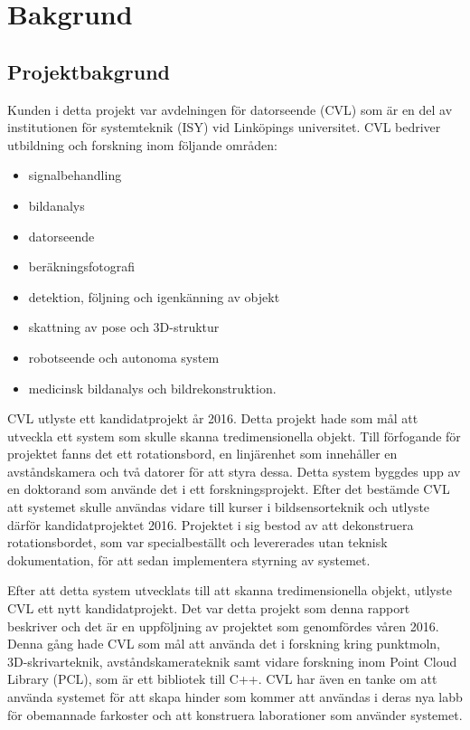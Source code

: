 \chapter{Bakgrund}
\label{cha:background}

\section{Projektbakgrund}
Kunden i detta projekt var avdelningen för datorseende (CVL) som är en del av institutionen för systemteknik (ISY) vid Linköpings universitet. CVL bedriver utbildning och forskning inom följande områden:
\begin{itemize}
	\item signalbehandling
	\item bildanalys
	\item datorseende
	\item beräkningsfotografi
	\item detektion, följning och igenkänning av objekt
	\item skattning av pose och 3D-struktur
	\item robotseende och autonoma system
	\item medicinsk bildanalys och bildrekonstruktion.
\end{itemize}

CVL utlyste ett kandidatprojekt år 2016. Detta projekt hade som mål att utveckla ett system som skulle skanna tredimensionella objekt. Till förfogande för projektet fanns det ett rotationsbord, en linjärenhet som innehåller en avståndskamera och två datorer för att styra dessa. Detta system byggdes upp av en doktorand som använde det i ett forskningsprojekt. Efter det bestämde CVL att systemet skulle användas vidare till kurser i bildsensorteknik och utlyste därför kandidatprojektet 2016. Projektet i sig bestod av att dekonstruera rotationsbordet, som var specialbeställt och levererades utan teknisk dokumentation, för att sedan implementera styrning av systemet.

Efter att detta system utvecklats till att skanna tredimensionella objekt, utlyste CVL ett nytt kandidatprojekt. Det var detta projekt som denna rapport beskriver och det är en uppföljning av projektet som genomfördes våren 2016. Denna gång hade CVL som mål att använda det i forskning kring punktmoln, 3D-skrivarteknik, avståndskamerateknik samt vidare forskning inom Point Cloud Library (PCL), som är ett bibliotek till C++. CVL har även en tanke om att använda systemet för att skapa hinder som kommer att användas i deras nya labb för obemannade farkoster och att konstruera laborationer som använder systemet. 

